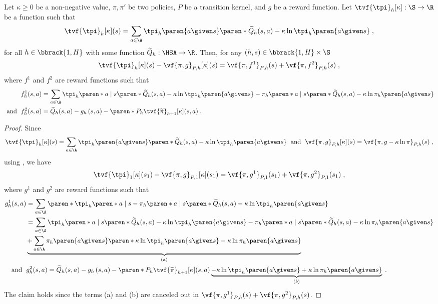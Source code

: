 \begin{lemma}\label{lemma:regularized value difference}
Let $\kappa \geq 0$ be a non-negative value, $\pi, \pi'$ be two policies, $P$ be a transition kernel, and $g$ be a reward function.
Let $\tvf{\tpi}_h[\kappa]: \S \to \R$ be a function such that 
$$
\tvf{\tpi}_h[\kappa](s) = \sum_{a \in \A}\tpi_h\paren{a\given s} \paren*{\widetilde{Q}_h(s, a) - \kappa \ln \tpi_h\paren{a\given s}}\;,$$ 
for all $h \in \bbrack{1, H}$ with some function $\widetilde{Q}_h: \HSA \to \R$.
Then, for any $(h, s) \in \bbrack{1, H}\times \S$
\begin{align*}
\tvf{\tpi}_h[\kappa](s)-\vf{\pi, g}_{P, h}[\kappa](s) 
= 
\vf{\pi, f^1}_{P, h}(s) + \vf{\pi, f^2}_{P, h}(s)\;,
\end{align*}
where $f^1$ and $f^2$ are reward functions such that
\begin{align*}
f^1_h(s, a) 
&= \sum_{a \in \A}\tpi_h\paren*{a\mid s}\paren*{\widetilde{Q}_h(s, a) - \kappa \ln \tpi_h\paren{a\given s}}
- \pi_h\paren*{a \mid s} \paren*{\widetilde{Q}_h(s, a) - \kappa \ln \pi_h\paren{a\given s}}\\
\text{ and }\;
f^2_h(s, a) &= 
\widetilde{Q}_h(s, a) 
-g_h\left(s, a\right)
-\paren*{P_h\tvf{\widetilde{\pi}}_{h+1}[\kappa]}(s, a)\;.
\end{align*}
\end{lemma}
\begin{proof}
Since 
$$
\tvf{\tpi}_h[\kappa](s) = \sum_{a \in \A}\tpi_h\paren{a\given s} 
\paren*{\widetilde{Q}_h(s, a) - \kappa \ln \tpi_h\paren{a\given s}}
\; \text{ and }\;
\vf{\pi, g}_{P, h}[\kappa](s) = 
\vf{\pi, g - \kappa \ln \pi}_{P, h}(s) \;,
$$ 
using , we have
\begin{align*}
\tvf{\tpi}_1[\kappa](s_1)  -\vf{\pi, g}_{P, 1}[\kappa](s_1) 
= 
\vf{\pi, g^1}_{P, 1}(s_1) + \vf{\pi, g^2}_{P, 1}(s_1)\;,
\end{align*}
where $g^1$ and $g^2$ are reward functions such that
\begin{align*}
g^1_h(s, a) 
&= \sum_{a \in \A}\paren*{\tpi_h\paren*{a\mid s}-\pi_h\paren*{a \mid s}} \paren*{\widetilde{Q}_h(s, a) - \kappa \ln \tpi_h\paren{a\given s}}\\
&= \sum_{a \in \A}\tpi_h\paren*{a\mid s}\paren*{\widetilde{Q}_h(s, a) - \kappa \ln \tpi_h\paren{a\given s}}
- 
\pi_h\paren*{a \mid s} 
\paren*{\widetilde{Q}_h(s, a) - \kappa \ln \pi_h\paren{a\given s}}
\\
&\underbrace{+ \sum_{a \in \A}\pi_h\paren{a \given s}
\paren*{\kappa \ln \tpi_h\paren{a\given s} - \kappa \ln \pi_h\paren{a\given s}}}_{\text{(a)}}\\
\text{ and }\;&g^2_h(s, a) = 
\widetilde{Q}_h(s, a) 
-g_h\left(s, a\right)
-\paren*{P_h\tvf{\widetilde{\pi}}_{h+1}[\kappa]}(s, a)
\underbrace{- \kappa \ln \tpi_h\paren{a\given s}
+ \kappa \ln \pi_h\paren{a \given s}}_{(b)}
\;.
\end{align*}
The claim holds since the terms (a) and (b) are canceled out in
\(
\vf{\pi, g^1}_{P, h}(s) + \vf{\pi, g^2}_{P, h}(s)
\).
\end{proof}

